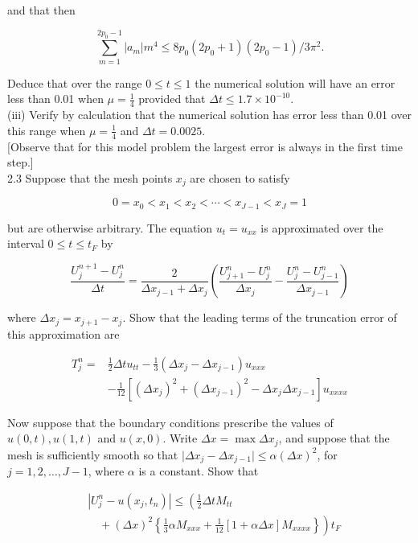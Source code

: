 \documentclass[10pt]{article}
\begin{document}
and that then

\[
\sum_{m=1}^{2 p_{0}-1}\left|a_{m}\right| m^{4} \leq 8 p_{0}\left(2 p_{0}+1\right)\left(2 p_{0}-1\right) / 3 \pi^{2} .
\]

Deduce that over the range \(0 \leq t \leq 1\) the numerical solution will have an error less than 0.01 when \(\mu=\frac{1}{4}\) provided that \(\Delta t \leq 1.7 \times 10^{-10}\).\\
(iii) Verify by calculation that the numerical solution has error less than 0.01 over this range when \(\mu=\frac{1}{4}\) and \(\Delta t=0.0025\).\\[0pt]
[Observe that for this model problem the largest error is always in the first time step.]\\
2.3 Suppose that the mesh points \(x_{j}\) are chosen to satisfy

\[
0=x_{0}<x_{1}<x_{2}<\cdots<x_{J-1}<x_{J}=1
\]

but are otherwise arbitrary. The equation \(u_{t}=u_{x x}\) is approximated over the interval \(0 \leq t \leq t_{F}\) by

\[
\frac{U_{j}^{n+1}-U_{j}^{n}}{\Delta t}=\frac{2}{\Delta x_{j-1}+\Delta x_{j}}\left(\frac{U_{j+1}^{n}-U_{j}^{n}}{\Delta x_{j}}-\frac{U_{j}^{n}-U_{j-1}^{n}}{\Delta x_{j-1}}\right)
\]

where \(\Delta x_{j}=x_{j+1}-x_{j}\). Show that the leading terms of the truncation error of this approximation are

\[
\begin{aligned}
T_{j}^{n}= & \frac{1}{2} \Delta t u_{t t}-\frac{1}{3}\left(\Delta x_{j}-\Delta x_{j-1}\right) u_{x x x} \\
& -\frac{1}{12}\left[\left(\Delta x_{j}\right)^{2}+\left(\Delta x_{j-1}\right)^{2}-\Delta x_{j} \Delta x_{j-1}\right] u_{x x x x}
\end{aligned}
\]

Now suppose that the boundary conditions prescribe the values of \(u(0, t), u(1, t)\) and \(u(x, 0)\). Write \(\Delta x=\max \Delta x_{j}\), and suppose that the mesh is sufficiently smooth so that \(\mid \Delta x_{j}- \Delta x_{j-1} \mid \leq \alpha(\Delta x)^{2}\), for \(j=1,2, \ldots, J-1\), where \(\alpha\) is a constant. Show that

\[
\begin{aligned}
& \left|U_{j}^{n}-u\left(x_{j}, t_{n}\right)\right| \leq\left(\frac{1}{2} \Delta t M_{t t}\right. \\
& \left.\quad+(\Delta x)^{2}\left\{\frac{1}{3} \alpha M_{x x x}+\frac{1}{12}[1+\alpha \Delta x] M_{x x x x}\right\}\right) t_{F}
\end{aligned}
\]
\end{document}
